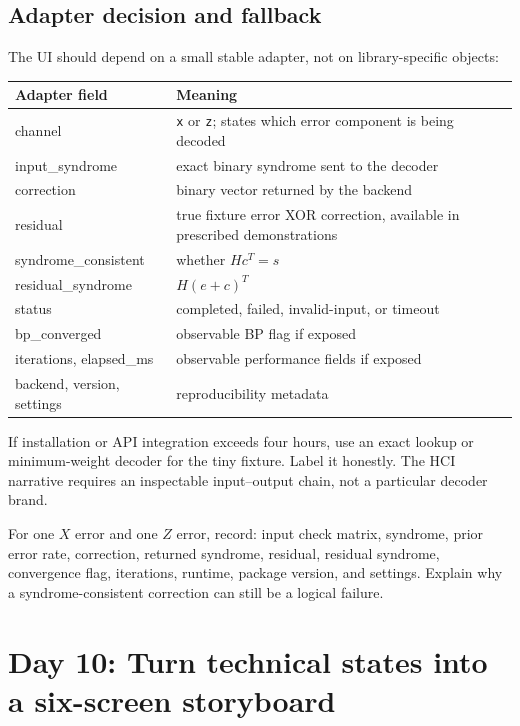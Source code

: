\documentclass[11pt]{article}
\begin{document}
\subsection{Adapter decision and fallback}

The UI should depend on a small stable adapter, not on library-specific objects:

\begin{center}
\begin{tabularx}{\textwidth}{>{\ttfamily\raggedright\arraybackslash}p{}X}
\toprule
Adapter field & Meaning \\
\midrule
channel & \texttt{x} or \texttt{z}; states which error component is being decoded \\
input\_syndrome & exact binary syndrome sent to the decoder \\
correction & binary vector returned by the backend \\
residual & true fixture error XOR correction, available in prescribed demonstrations \\
syndrome\_consistent & whether \(Hc^T=s\) \\
residual\_syndrome & \(H(e+c)^T\) \\
status & completed, failed, invalid-input, or timeout \\
bp\_converged & observable BP flag if exposed \\
iterations, elapsed\_ms & observable performance fields if exposed \\
backend, version, settings & reproducibility metadata \\
\bottomrule
\end{tabularx}
\end{center}

If installation or API integration exceeds four hours, use an exact lookup or minimum-weight decoder
for the tiny fixture. Label it honestly. The HCI narrative requires an inspectable input--output chain,
not a particular decoder brand.

\begin{masterybox}[title={Day 9 decoder checks}]
For one \(X\) error and one \(Z\) error, record: input check matrix, syndrome, prior error rate,
correction, returned syndrome, residual, residual syndrome, convergence flag, iterations, runtime,
package version, and settings. Explain why a syndrome-consistent correction can still be a logical
failure.
\end{masterybox}

\section{Day 10: Turn technical states into a six-screen storyboard}
\end{document}

